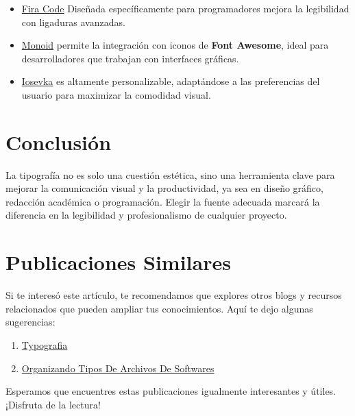 \documentclass[
  jou,
  floatsintext,
  longtable,
  a4paper,
  nolmodern,
  notxfonts,
  notimes,
  12pt,
  colorlinks=true,linkcolor=blue,citecolor=blue,urlcolor=blue]{apa7}
\providecommand{\tightlist}{%
  \setlength{\itemsep}{0pt}\setlength{\parskip}{0pt}}
\begin{document}
\begin{itemize}
\item
  \href{https://github.com/tonsky/FiraCode}{Fira Code} Diseñada
  específicamente para programadores mejora la legibilidad con ligaduras
  avanzadas.
\item
  \href{http://larsenwork.com/monoid/}{Monoid} permite la integración
  con iconos de \textbf{Font Awesome}, ideal para desarrolladores que
  trabajan con interfaces gráficas.
\item
  \href{https://be5invis.github.io/Iosevka/}{Iosevka} es altamente
  personalizable, adaptándose a las preferencias del usuario para
  maximizar la comodidad visual.
\end{itemize}

\section{Conclusión}\label{conclusiuxf3n}

La tipografía no es solo una cuestión estética, sino una herramienta
clave para mejorar la comunicación visual y la productividad, ya sea en
diseño gráfico, redacción académica o programación. Elegir la fuente
adecuada marcará la diferencia en la legibilidad y profesionalismo de
cualquier proyecto.

\section{Publicaciones Similares}\label{publicaciones-similares}

Si te interesó este artículo, te recomendamos que explores otros blogs y
recursos relacionados que pueden ampliar tus conocimientos. Aquí te dejo
algunas sugerencias:

\begin{enumerate}
\def\labelenumi{\arabic{enumi}.}
\tightlist
\item
  \href{https://numerus-scriptum.netlify.app/fundamentos-programacion/2018-06-09-typografia/index.pdf}{}
  \href{https://numerus-scriptum.netlify.app/fundamentos-programacion/2018-06-09-typografia}{Typografia}
\item
  \href{https://numerus-scriptum.netlify.app/fundamentos-programacion/2019-08-13-organizando-tipos-de-archivos-de-softwares/index.pdf}{}
  \href{https://numerus-scriptum.netlify.app/fundamentos-programacion/2019-08-13-organizando-tipos-de-archivos-de-softwares}{Organizando
  Tipos De Archivos De Softwares}
\end{enumerate}

Esperamos que encuentres estas publicaciones igualmente interesantes y
útiles. ¡Disfruta de la lectura!
\end{document}
